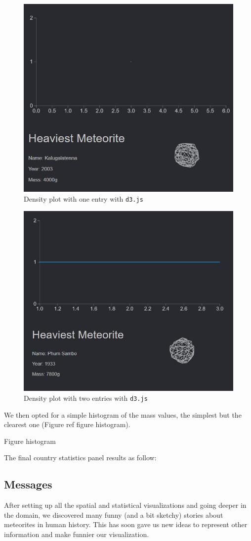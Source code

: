 \documentclass[10pt,conference,compsocconf]{IEEEtran}
\begin{document}
\begin{figure}[H]
  \centering
  \includegraphics[width=.5\columnwidth]{images/one_point_density_plot}
  \vspace{-3mm}
  \caption{Density plot with one entry with \texttt{d3.js}}
  \label{fig:density_one}
\end{figure}

\begin{figure}[H]
  \centering
  \includegraphics[width=.5\columnwidth]{images/two_point_density_plot}
  \vspace{-3mm}
  \caption{Density plot with two entries with \texttt{d3.js}}
  \label{fig:density_two}
\end{figure}

We then opted for a simple histogram of the mass values, the simplest but the clearest one (Figure ref figure histogram). 


Figure histogram



The final country statistics panel results as follow: 




\subsection{Messages}
After setting up all the spatial and statistical visualizations and going deeper in the domain, we discovered many funny (and a bit sketchy) stories about meteorites in human history. This has soon gave us new ideas to represent other information and make funnier our visualization. 
\end{document}
